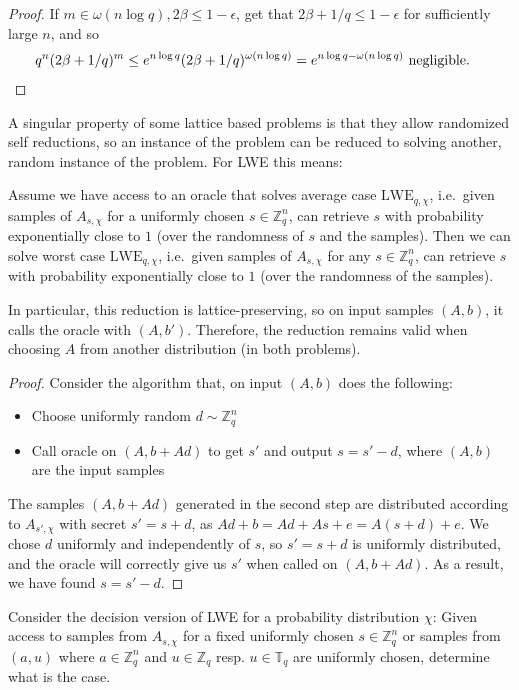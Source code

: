 \documentclass{report}
\newcommand{\T}{\mathbb{T}}
\newcommand{\Z}{\mathbb{Z}}
\begin{document}
\begin{proof}
If $m \in \omega(n\log q), 2\beta \leq 1 - \epsilon$, get that $2\beta + 1/q \leq 1 - \epsilon$ for sufficiently large $n$, and so
\begin{align*}
q^n(2\beta + 1/q)^m \leq e^{n\log q}(2\beta + 1/q)^{\omega(n\log q)} = e^{n\log q - \omega(n\log q)} \text{ negligible.} & \qedhere
\end{align*}
\end{proof}

\label{average_to_worst}
A singular property of some lattice based problems is that they allow randomized self reductions, so an instance of the problem can be reduced to solving another, random instance of the problem. For LWE this means:

Assume we have access to an oracle that solves average case $\mathrm{LWE}_{q, \chi}$, i.e.\ given samples of $A_{s, \chi}$ for a uniformly chosen $s \in \Z_q^n$, can retrieve $s$ with probability exponentially close to $1$ (over the randomness of $s$ and the samples). Then we can solve worst case $\mathrm{LWE}_{q, \chi}$, i.e.\ given samples of $A_{s, \chi}$ for any $s \in \Z_q^n$, can retrieve $s$ with probability exponentially close to $1$ (over the randomness of the samples).

In particular, this reduction is lattice-preserving, so on input samples $(A, b)$, it calls the oracle with $(A, b')$. Therefore, the reduction remains valid when choosing $A$ from another distribution (in both problems).

\begin{proof}
Consider the algorithm that, on input $(A, b)$ does the following:
\begin{itemize}
\item Choose uniformly random $d \sim \Z_q^n$
\item Call oracle on $(A, b + Ad)$ to get $s'$ and output $s = s' - d$, where $(A, b)$ are the input samples
\end{itemize}
The samples $(A, b + Ad)$ generated in the second step are distributed according to $A_{s',  \chi}$ with secret $s' = s + d$, as $Ad + b = Ad + As + e = A(s + d) + e$. We chose $d$ uniformly and independently of $s$, so $s' = s + d$ is uniformly distributed, and the oracle will correctly give us $s'$ when called on $(A, b + Ad)$. As a result, we have found $s = s' - d$.\qedhere
\end{proof}

Consider the decision version of LWE for a probability distribution $\chi$: Given access to samples from $A_{s, \chi}$ for a fixed uniformly chosen $s \in \Z_q^n$ or samples from $(a, u)$ where $a \in \Z_q^n$ and $u \in \Z_q$ resp. $u \in \T_q$ are uniformly chosen, determine what is the case.
\end{document}
